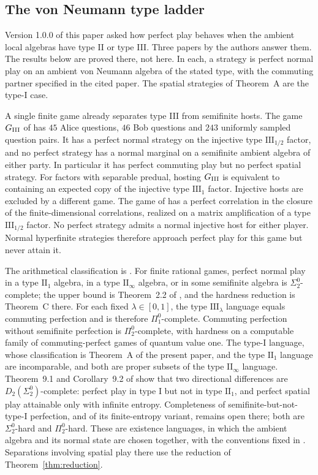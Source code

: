 \subsection{The von Neumann type ladder}\label{sec:typeladder}
Version 1.0.0 of this paper asked how perfect play behaves when the ambient local algebras have type II or type III. Three papers by the authors answer them. The results below are proved there, not here. In each, a strategy is perfect normal play on an ambient von Neumann algebra of the stated type, with the commuting partner specified in the cited paper. The spatial strategies of Theorem~A are the type-I case.

A single finite game already separates type III from semifinite hosts. The game $G_{\rm III}$ of \cite[Theorem~1.1]{ReadType} has $45$ Alice questions, $46$ Bob questions and $243$ uniformly sampled question pairs. It has a perfect normal strategy on the injective type $\mathrm{III}_{1/2}$ factor, and no perfect strategy has a normal marginal on a semifinite ambient algebra of either party. In particular it has perfect commuting play but no perfect spatial strategy. For factors with separable predual, hosting $G_{\rm III}$ is equivalent to containing an expected copy of the injective type $\mathrm{III}_1$ factor. Injective hosts are excluded by a different game. The game of \cite[Theorem~1.1]{Hyperfinite} has a perfect correlation in the closure of the finite-dimensional correlations, realized on a matrix amplification of a type $\mathrm{III}_{1/2}$ factor. No perfect strategy admits a normal injective host for either player. Normal hyperfinite strategies therefore approach perfect play for this game but never attain it.

The arithmetical classification is \cite[Theorem~A]{TypeLadder}. For finite rational games, perfect normal play in a type $\mathrm{II}_1$ algebra, in a type $\mathrm{II}_\infty$ algebra, or in some semifinite algebra is $\Sigma^0_2$-complete; the upper bound is Theorem~2.2 of \cite{TypeLadder}, and the hardness reduction is Theorem~C there. For each fixed $\lambda\in[0,1]$, the type $\mathrm{III}_\lambda$ language equals commuting perfection \cite[Theorem~7.2]{TypeLadder} and is therefore $\Pi^0_1$-complete. Commuting perfection without semifinite perfection is $\Pi^0_2$-complete, with hardness on a computable family of commuting-perfect games of quantum value one. The type-I language, whose classification is Theorem~A of the present paper, and the type $\mathrm{II}_1$ language are incomparable, and both are proper subsets of the type $\mathrm{II}_\infty$ language. Theorem~9.1 and Corollary~9.2 of \cite{TypeLadder} show that two directional differences are $D_2(\Sigma^0_2)$-complete: perfect play in type I but not in type $\mathrm{II}_1$, and perfect spatial play attainable only with infinite entropy. Completeness of semifinite-but-not-type-I perfection, and of its finite-entropy variant, remains open there; both are $\Sigma^0_2$-hard and $\Pi^0_2$-hard. These are existence languages, in which the ambient algebra and its normal state are chosen together, with the conventions fixed in \cite[Section~1]{TypeLadder}. Separations involving spatial play there use the reduction of Theorem~\ref{thm:reduction}.

